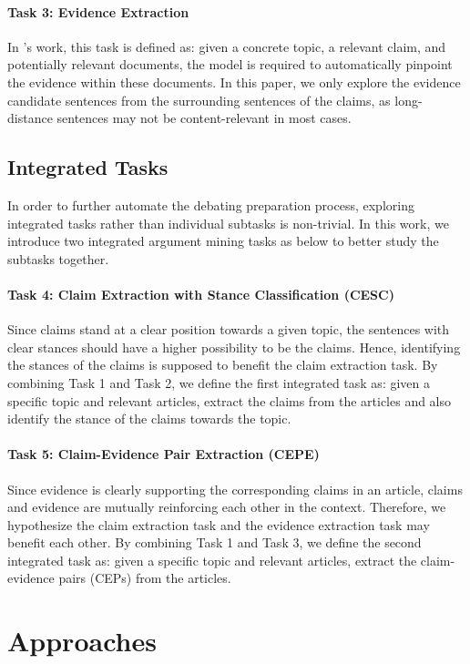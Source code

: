 \documentclass[11pt]{article}
\begin{document}
\paragraph{Task 3: Evidence Extraction}
In \citet{rinott2015show}'s work, this task is defined as: given a concrete topic, a relevant claim, and potentially relevant documents, the model is required to automatically pinpoint the evidence within these documents. In this paper, we only explore the evidence candidate sentences from the surrounding sentences of the claims, as long-distance sentences may not be content-relevant in most cases.

\subsection{Integrated Tasks}

In order to further automate the debating preparation process, exploring integrated tasks rather than individual subtasks is non-trivial. In this work, we introduce two integrated argument mining tasks as below to better study the subtasks together.

\paragraph{Task 4: Claim Extraction with Stance Classification (CESC)}
Since claims stand at a clear position towards a given topic, the sentences with clear stances should have a higher possibility to be the claims.
Hence, identifying the stances of the claims is supposed to benefit the claim extraction task.
By combining Task 1 and Task 2, we define the first integrated task as: given a specific topic and relevant articles, extract the claims from the articles and also identify the stance of the claims towards the topic.


\paragraph{Task 5: Claim-Evidence Pair Extraction (CEPE)}
Since evidence is clearly supporting the corresponding claims in an article, claims and evidence are mutually reinforcing each other in the context. Therefore, we hypothesize the claim extraction task and the evidence extraction task may benefit each other.
By combining Task 1 and Task 3, we define the second integrated task as: given a specific topic and relevant articles, extract the claim-evidence pairs (CEPs) from the articles.


\section{Approaches}
\end{document}

